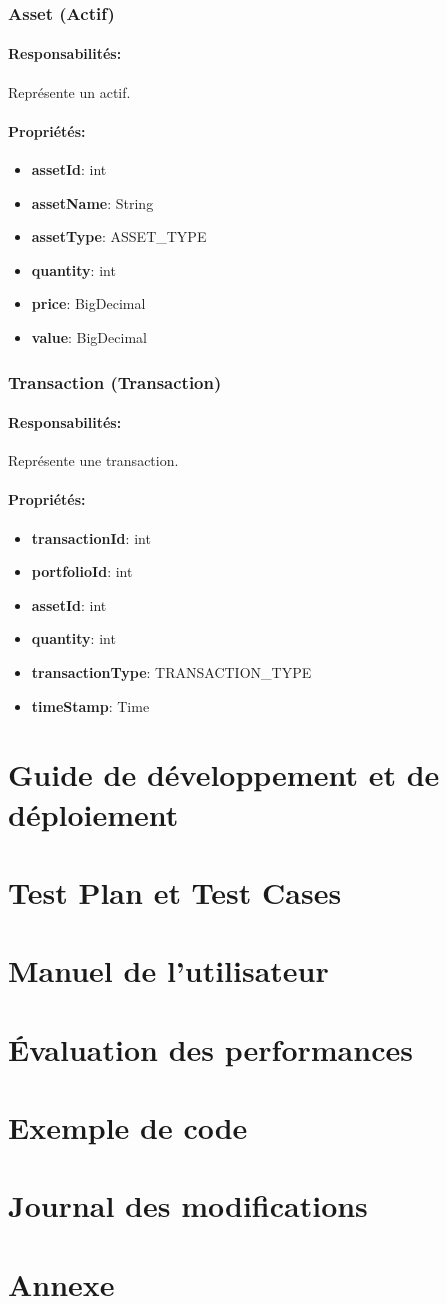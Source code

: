 \documentclass{article}
\begin{document}
\subsubsection{Asset (Actif)}
\paragraph{Responsabilités:} Représente un actif.
\paragraph{Propriétés:}
\begin{itemize}
  \item \textbf{assetId}: int
  \item \textbf{assetName}: String
  \item \textbf{assetType}: ASSET\_TYPE
  \item \textbf{quantity}: int
  \item \textbf{price}: BigDecimal
  \item \textbf{value}: BigDecimal
\end{itemize}
\subsubsection{Transaction (Transaction)}
\paragraph{Responsabilités:} Représente une transaction.
\paragraph{Propriétés:}
\begin{itemize}
  \item \textbf{transactionId}: int
  \item \textbf{portfolioId}: int
  \item \textbf{assetId}: int
  \item \textbf{quantity}: int
  \item \textbf{transactionType}: TRANSACTION\_TYPE
  \item \textbf{timeStamp}: Time
\end{itemize}
\section{Guide de développement et de déploiement}
\section{Test Plan et Test Cases}
\section{Manuel de l'utilisateur}
\section{Évaluation des performances}
\section{Exemple de code}
\section{Journal des modifications}
\section{Annexe}
\end{document}

